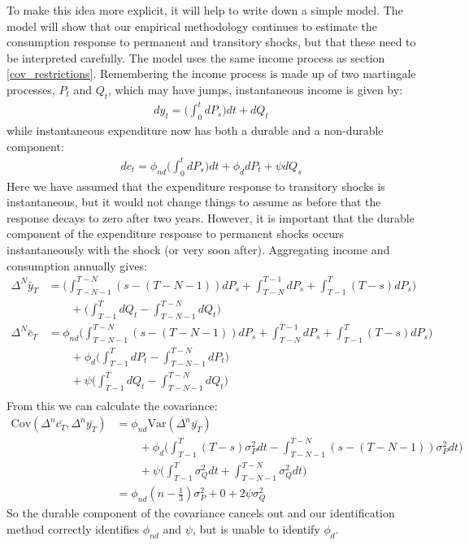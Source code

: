 \documentclass[titlepage]{\econtex}\newcommand{\texname}{ConsumptionHeterogeneity}
\begin{document}
To make this idea more explicit, it will help to write down a simple model. The model will show that our empirical methodology continues to estimate the consumption response to permanent and transitory shocks, but that these need to be interpreted carefully. The model uses the same income process as section \ref{cov_restrictions}. Remembering the income process is made up of two martingale processes, $P_t$ and $Q_t$, which may have jumps, instantaneous income is given by:
\begin{align*}
dy_t = \Big( \int_{0}^{t}dP_s \Big) dt  +dQ_t 
\end{align*}
while instantaneous expenditure now has both a durable and a non-durable component:
\begin{align*}
dc_t = \phi_{nd} \Big( \int_{0}^{t} dP_s  \Big) dt + \phi_{d} dP_t + \psi dQ_s
\end{align*}
Here we have assumed that the expenditure response to transitory shocks is instantaneous, but it would not change things to assume as before that the response decays to zero after two years. However, it is important that the durable component of the expenditure response to permanent shocks occurs instantaneously with the shock (or very soon after). Aggregating income and consumption annually gives:
\begin{align*}
\Delta^N \bar{y}_T &=  \Big(\int_{T-N-1}^{T-N} (s-(T-N-1))dP_s  + \int_{T-N}^{T-1}dP_s + \int_{T-1}^{T} (T-s)dP_s \Big) \\
& \qquad + \Big(\int_{T-1}^{T} dQ_t -\int_{T-N-1}^{T-N} dQ_t \Big) \\
\Delta^N \bar{c}_T &= \phi_{nd} \Big(\int_{T-N-1}^{T-N} (s-(T-N-1))dP_s  + \int_{T-N}^{T-1}dP_s + \int_{T-1}^{T} (T-s)dP_s \Big) \\
& \qquad + \phi_d \Big(\int_{T-1}^{T} dP_t -\int_{T-N-1}^{T-N} dP_t \Big) \\
& \qquad + \psi \Big(\int_{T-1}^{T} dQ_t -\int_{T-N-1}^{T-N} dQ_t \Big) \\
\end{align*}
From this we can calculate the covariance:
\begin{align*}
\mathrm{Cov}(\Delta^n \bar{c_T},\Delta^n \bar{y_T} ) &= \phi_{nd} \mathrm{Var}(\Delta^n \bar{y_T}) \\
& \qquad + \phi_d \Bigg( \int_{T-1}^{T} (T-s) \sigma_P^2 dt - \int_{T-N-1}^{T-N}(s-(T-N-1)) \sigma_P^2 dt \Bigg) \\
& \qquad + \psi\Bigg(\int_{T-1}^{T}  \sigma_Q^2 dt + \int_{T-N-1}^{T-N}\sigma_Q^2 dt\Bigg) \\
&= \phi_{nd} (n-\frac{1}{3})\sigma_P^2 + 0 +  2 \psi \sigma_Q^2
\end{align*}
So the durable component of the covariance cancels out and our identification method correctly identifies $\phi_{nd}$ and $\psi$, but is unable to identify $\phi_d$.
\end{document}

